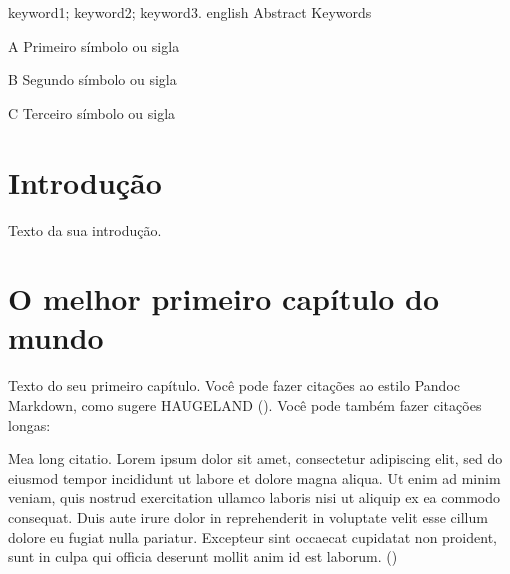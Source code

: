\documentclass[
  12pt,
  a4paper,
  oneside,
  openright,
  sumario=abnt-6027-2012,
  english,
  brazil]{abntex2}
\begin{document}
{keyword1; keyword2; keyword3.}
{english}
{Abstract}
{Keywords}

\listoffigures*
\cleardoublepage

\listoftables*
\cleardoublepage

\begin{siglas}
			\item[A] Primeiro símbolo ou sigla
				\item[B] Segundo símbolo ou sigla
				\item[C] Terceiro símbolo ou sigla
	\end{siglas}




{
\setcounter{tocdepth}{2}
\indent\tableofcontents*
\cleardoublepage
}


\textual

\chapter*{Introdução}\label{introduuxe7uxe3o}

Texto da sua introdução.

\chapter{O melhor primeiro capítulo do
mundo}\label{o-melhor-primeiro-capuxedtulo-do-mundo}

Texto do seu primeiro capítulo. Você pode fazer citações ao estilo
Pandoc Markdown, como sugere HAUGELAND
(). Você pode também fazer citações
longas:

\begin{citacao}

Mea long citatio. Lorem ipsum dolor sit amet, consectetur adipiscing
elit, sed do eiusmod tempor incididunt ut labore et dolore magna aliqua.
Ut enim ad minim veniam, quis nostrud exercitation ullamco laboris nisi
ut aliquip ex ea commodo consequat. Duis aute irure dolor in
reprehenderit in voluptate velit esse cillum dolore eu fugiat nulla
pariatur. Excepteur sint occaecat cupidatat non proident, sunt in culpa
qui officia deserunt mollit anim id est laborum.
()

\end{citacao}
\end{document}
